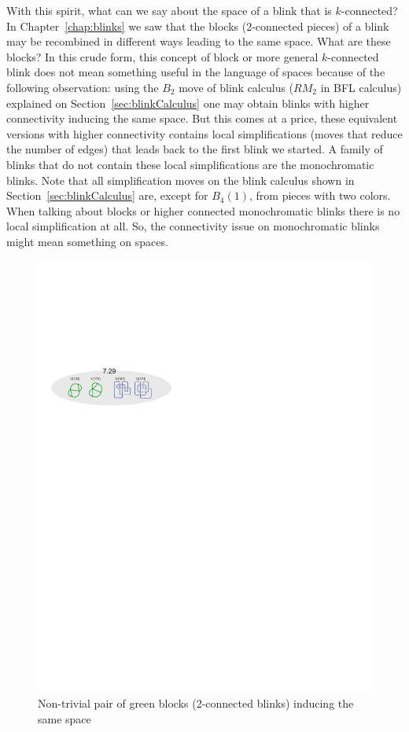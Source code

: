With this spirit, what can we say about the space of a blink that is
$k$-connected? In Chapter~\ref{chap:blinks} we saw that the blocks
(2-connected pieces) of a blink may be recombined in different
ways leading to the same space. What are these blocks?
In this crude form, this concept of block or more general
$k$-connected blink does not mean something useful in
the language of spaces because of the following
observation: using the $B_2$ move of blink calculus
(\ie $RM_2$ in BFL calculus) explained
on Section~\ref{sec:blinkCalculus} one
may obtain blinks with higher connectivity inducing
the same space. But this comes
at a price, these equivalent versions with higher
connectivity contains local simplifications (moves
that reduce the number of edges) that leads back to
the first blink we started. A family of blinks
that do not contain these local simplifications are the
monochromatic blinks. Note that all simplification moves
on the blink calculus shown in Section~\ref{sec:blinkCalculus}
are, except for $B_4(1)$, from pieces with two colors. When
talking about blocks or higher connected monochromatic
blinks there is no local simplification at all.
So, the connectivity issue on monochromatic blinks
might mean something on spaces.

\begin{figure}[htp]
   \begin{center}
      \leavevmode
      \includegraphics{fig/nonTrivialGreenBlocks.pdf}
   \end{center}
   \vspace{-0.7cm}
   \caption{ Non-trivial pair of green blocks (2-connected blinks) inducing the same space}
   \label{fig:nonTrivialGreenBlocks}
\end{figure}

